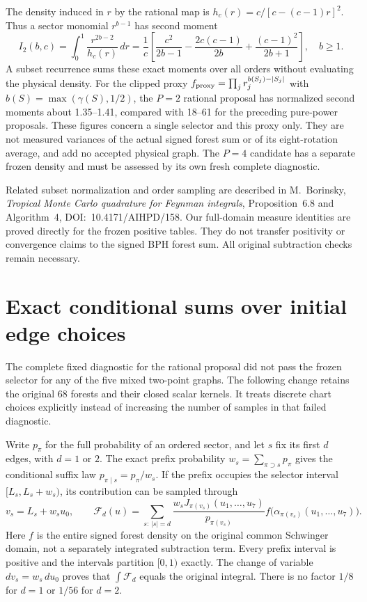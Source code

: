 \documentclass[11pt]{article}
\begin{document}
The density induced in $r$ by the rational map is
$h_c(r)=c/[c-(c-1)r]^2$. Thus a sector monomial $r^{b-1}$ has second moment
\[
 I_2(b,c)=\int_0^1\frac{r^{2b-2}}{h_c(r)}\,dr
 =\frac1c\left[\frac{c^2}{2b-1}
       -\frac{2c(c-1)}{2b}+\frac{(c-1)^2}{2b+1}\right],\quad b\geq1.
\]
A subset recurrence sums these exact moments over all orders without
evaluating the physical density. For the clipped proxy
$f_{\rm proxy}=\prod_jr_j^{b(S_j)-|S_j|}$ with
$b(S)=\max(\gamma(S),1/2)$, the $P=2$ rational proposal has normalized
second moments about 1.35--1.41, compared with 18--61 for the preceding
pure-power proposals. These figures concern a single selector and this
proxy only. They are not measured variances of the actual signed forest
sum or of its eight-rotation average, and add no accepted physical graph.
The $P=4$ candidate has a separate frozen density and must be assessed by
its own fresh complete diagnostic.

Related subset normalization and order sampling are described in
M.~Borinsky, \emph{Tropical Monte Carlo quadrature for Feynman integrals},
Proposition~6.8 and Algorithm~4, DOI:~10.4171/AIHPD/158.
Our full-domain measure identities are proved directly for the frozen
positive tables. They do not transfer positivity or convergence claims
to the signed BPH forest sum. All original subtraction checks remain necessary.
\section{Exact conditional sums over initial edge choices}
The complete fixed diagnostic for the rational proposal did not pass the
frozen selector for any of the five mixed two-point graphs. The following
change retains the original 68 forests and their closed scalar kernels.
It treats discrete chart choices explicitly instead of increasing the
number of samples in that failed diagnostic.

Write $p_\pi$ for the full probability of an ordered sector, and let $s$
fix its first $d$ edges, with $d=1$ or $2$. The exact prefix probability
$w_s=\sum_{\pi\supset s}p_\pi$ gives the conditional suffix law
$p_{\pi\mid s}=p_\pi/w_s$. If the prefix occupies the selector interval
$[L_s,L_s+w_s)$, its contribution can be sampled through
\[
 v_s=L_s+w_s u_0,\qquad
 \mathcal F_d(u)=\sum_{s:\,|s|=d}
       \frac{w_s J_{\pi(v_s)}(u_1,\ldots,u_7)}{p_{\pi(v_s)}}
       f\bigl(\alpha_{\pi(v_s)}(u_1,\ldots,u_7)\bigr).
\]
Here $f$ is the entire signed forest density on the original common
Schwinger domain, not a separately integrated subtraction term. Every
prefix interval is positive and the intervals partition $[0,1)$ exactly.
The change of variable $dv_s=w_s\,du_0$ proves that
$\int\mathcal F_d$ equals the original integral. There is no factor
$1/8$ for $d=1$ or $1/56$ for $d=2$.
\end{document}
